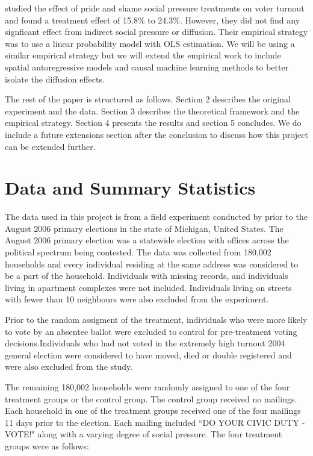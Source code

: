 \documentclass[11pt]{article}
\begin{document}
\cite{haenschen_social_2016} studied the effect of pride and shame social pressure treatments on voter turnout and found a treatment effect of 15.8\% to 24.3\%. However, they did not find any signficant effect from indirect social pressure or diffusion. Their empirical strategy was to use a linear probability model with OLS estimation. We will be using a similar empirical strategy but we will extend the empirical work to include spatial autoregressive models and causal machine learning methods to better isolate the diffusion effects.

The rest of the paper is structured as follows. Section 2 describes the original experiment and the data. Section 3 describes the theoretical framework and the empirical strategy. Section 4 presents the results and section 5 concludes. We do include a future extensions section after the conclusion to discuss how this project can be extended further.

\section{Data and Summary Statistics}
The data used in this project is from a field experiment conducted by \cite{gerber_social_2008} prior to the August 2006 primary elections in the state of Michigan, United States. The August 2006 primary election was a statewide election with offices across the political spectrum being contested. The data was collected from 180,002 households and every individual residing at the same address was considered to be a part of the household. Individuals with missing records, and individuals living in apartment complexes were not included. Individuals living on streets with fewer than 10 neighbours were also excluded from the experiment.

Prior to the random assigment of the treatment, individuals who were more likely to vote by an absentee ballot were excluded to control for pre-treatment voting decisions.Individuals who had not voted in the extremely high turnout 2004 general election were considered to have moved, died or double registered and were also excluded from the study.

The remaining 180,002 households were randomly assigned to one of the four treatment groups or the control group. The control group received no mailings. Each household in one of the treatment groups received one of the four mailings 11 days prior to the election. Each mailing included ``DO YOUR CIVIC DUTY - VOTE!" along with a varying degree of social pressure. The four treatment groups were as follows:
\end{document}
